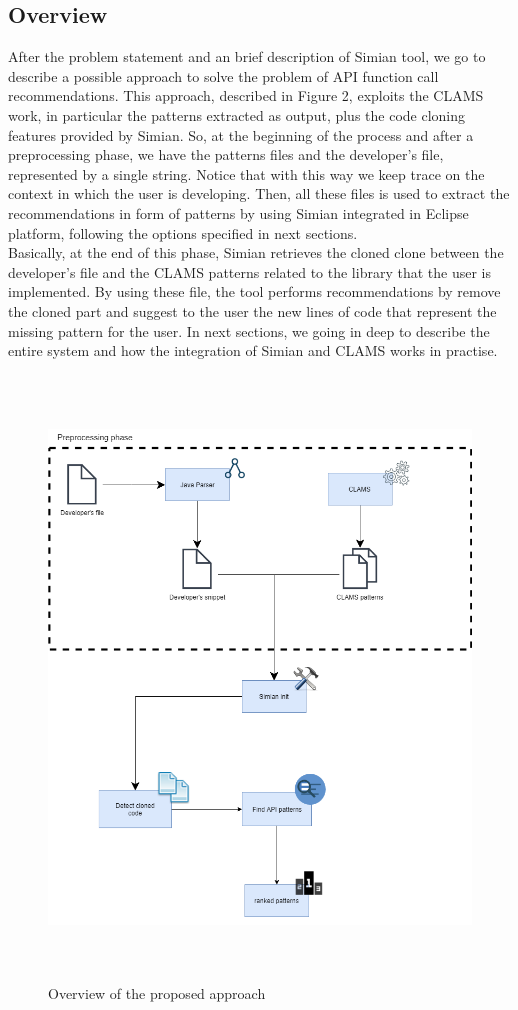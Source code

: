 
\subsection{Overview}
After the problem statement and an brief description of Simian tool, we go to describe a possible approach to solve the problem of API function call recommendations. This approach, described in Figure 2, exploits the CLAMS work, in particular the patterns extracted as output, plus the code cloning features provided by Simian. So, at the beginning of the process and after a preprocessing phase, we have the patterns files and the developer's file, represented by a single string. Notice that with this way we keep trace on the context in which the user is developing. Then, all these files is used to extract the recommendations in form of patterns by using Simian integrated in Eclipse platform, following the options specified in next sections. \\
Basically, at the end of this phase, Simian retrieves the cloned clone between the developer's file and the CLAMS patterns related to the library that the user is implemented. By using these file, the tool performs recommendations by remove the cloned part and suggest to the user the new lines of code that represent the missing pattern for the user. In next sections, we going in deep to describe the entire system and how the integration of Simian and CLAMS works in practise. 


\begin{figure}[H]
\includegraphics[width=14cm,height=16cm,keepaspectratio]{images/simian.png}
\centering
\caption{Overview of the proposed approach}
\label{fig:cmd}
\end{figure}

